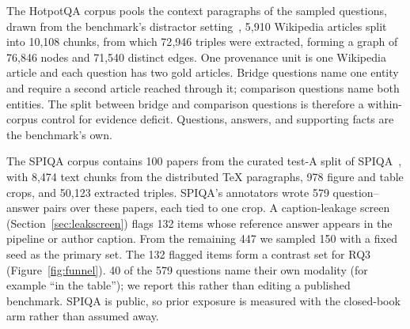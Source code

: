\documentclass[preprint,12pt]{elsarticle}
\begin{document}
\begin{table}[!tbp]
\centering
\caption{Question sets. ``Role'' states whether a set carries headline claims
or serves as a mechanism test. Graph-seeded items were generated from entities
in the same graph that +KGret searches and are never pooled with other sets.}
\label{tab:qsets}
\footnotesize
{}
\end{table}

The HotpotQA corpus pools the context paragraphs of the sampled questions,
drawn from the benchmark's distractor setting~\cite{yang2018hotpotqa}, 5{,}910 Wikipedia
articles split into 10{,}108 chunks, from which 72{,}946 triples were
extracted, forming a graph of 76{,}846 nodes and 71{,}540 distinct edges. One
provenance unit is one Wikipedia article and each question has two gold
articles. Bridge questions name one entity and require a second article
reached through it; comparison questions name both entities. The split
between bridge and comparison questions is therefore a within-corpus control
for evidence deficit. Questions, answers, and supporting
facts are the benchmark's own.

The SPIQA corpus contains 100 papers from the curated test-A split of
SPIQA~\cite{spiqa}, with 8{,}474 text chunks from the distributed TeX
paragraphs, 978 figure and table crops, and 50{,}123 extracted triples. SPIQA's
annotators wrote 579 question--answer pairs over these papers, each tied to
one crop. A caption-leakage screen (Section~\ref{sec:leakscreen}) flags 132
items whose reference answer appears in the pipeline or author caption. From
the remaining 447 we sampled 150 with a fixed seed as the primary set. The 132
flagged items form a contrast set for RQ3 (Figure~\ref{fig:funnel}). 40 of the
579 questions name their own modality (for example ``in the table''); we
report this rather than editing a published benchmark. SPIQA is public, so
prior exposure is measured with the closed-book arm rather than assumed away.
\end{document}
